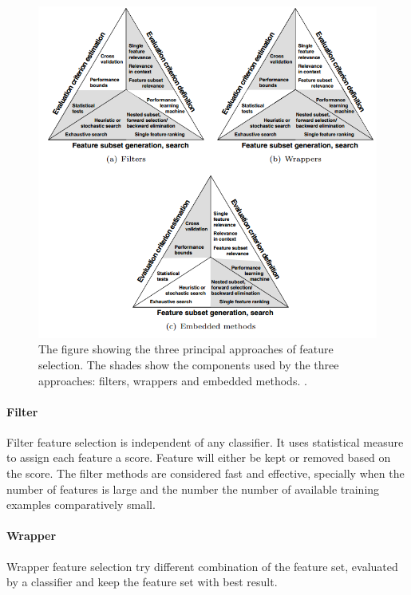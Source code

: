 \documentclass[USenglish]{ifimaster}  %
\begin{document}
\begin{figure}[h]
    \centering
    \includegraphics[scale=0.7]{Figures/FilterWrapperEmbedded.PNG}
    \caption{The figure showing the three principal approaches of feature selection. The shades show the
components used by the three approaches: filters, wrappers and embedded methods. \cite{Guyon2006}.}
    \label{fig:fitting}
\end{figure}


\paragraph{Filter}
Filter feature selection is independent of any classifier. It uses statistical measure to assign each feature a score. Feature will either be kept or removed based on the score. The filter methods are considered fast and effective, specially when the number of features is large and the number the number of available training examples comparatively small.  


\paragraph{Wrapper}
Wrapper feature selection try different combination of the feature set, evaluated by a classifier and keep the feature set with best result.
\end{document}
